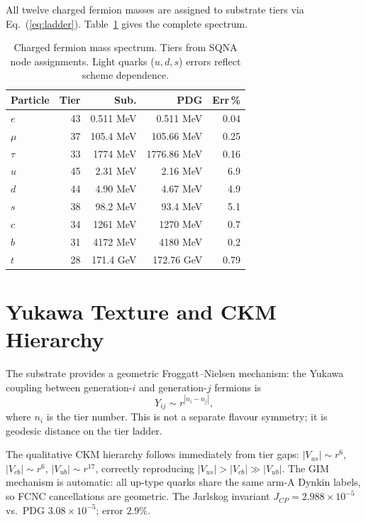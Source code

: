 \documentclass[aps,prl,twocolumn,superscriptaddress,nofootinbib]{revtex4-2}
\begin{document}
All twelve charged fermion masses are assigned to substrate tiers
via Eq.~(\ref{eq:ladder}).
Table~\ref{tab:fermions} gives the complete spectrum.

\begin{table}[h]
\caption{Charged fermion mass spectrum. Tiers from SQNA node assignments.
Light quarks ($u,d,s$) errors reflect scheme dependence.}
\label{tab:fermions}
\begin{ruledtabular}
\begin{tabular}{lrrrr}
Particle & Tier & Sub. & PDG & Err\,\% \\
\hline
$e$ & 43 & 0.511 MeV & 0.511 MeV & 0.04 \\
$\mu$ & 37 & 105.4 MeV & 105.66 MeV & 0.25 \\
$\tau$ & 33 & 1774 MeV & 1776.86 MeV & 0.16 \\
$u$ & 45 & 2.31 MeV & 2.16 MeV & 6.9 \\
$d$ & 44 & 4.90 MeV & 4.67 MeV & 4.9 \\
$s$ & 38 & 98.2 MeV & 93.4 MeV & 5.1 \\
$c$ & 34 & 1261 MeV & 1270 MeV & 0.7 \\
$b$ & 31 & 4172 MeV & 4180 MeV & 0.2 \\
$t$ & 28 & 171.4 GeV & 172.76 GeV & 0.79 \\
\end{tabular}
\end{ruledtabular}
\end{table}

\section{Yukawa Texture and CKM Hierarchy}

The substrate provides a geometric Froggatt--Nielsen mechanism:
the Yukawa coupling between generation-$i$ and generation-$j$ fermions is
\begin{equation}
Y_{ij} \sim r^{|n_i - n_j|},
\label{eq:yukawa}
\end{equation}
where $n_i$ is the tier number. This is not a separate flavour symmetry;
it is geodesic distance on the tier ladder.

The qualitative CKM hierarchy follows immediately from tier gaps:
$|V_{us}|\sim r^6$, $|V_{cb}|\sim r^6$, $|V_{ub}|\sim r^{17}$,
correctly reproducing $|V_{us}|>|V_{cb}|\gg|V_{ub}|$.
The GIM mechanism is automatic: all up-type quarks share the same
arm-A Dynkin labels, so FCNC cancellations are geometric.
The Jarlskog invariant $J_{CP}=2.988\times10^{-5}$
vs.\ PDG $3.08\times10^{-5}$; error $2.9\%$.
\end{document}
